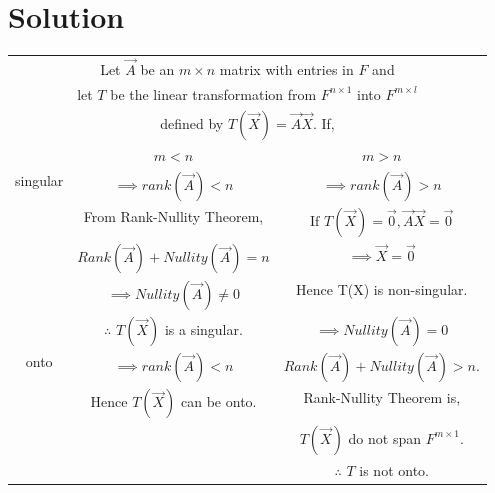 \documentclass[journal,12pt,twocolumn]{IEEEtran}
\begin{document}
\section{Solution}
\begin{table}[hp]
	\begin{center}
	\begin{adjustbox}{width=1\textwidth}
		\begin{tabular}{|c|c|c|}			
			\hline
			\multicolumn{3}{|c|}{Let $\vec{A}$ be an $m \times n$ matrix with entries in $F$ and}\\
			\multicolumn{3}{|c|}{let $T$ be the linear transformation from $F^{n \times1 }$ into $F^{m \times l}$}\\
			\multicolumn{3}{|c|}{defined by $T(\vec{X}) = \vec{A}\vec{X}$. If,}\\			
			\hline
			& \multicolumn{1}{|c|}{$m < n$} & \multicolumn{1}{c|}{$m > n$}\\
			\hline
			\multirow{4}{*}{singular} & \vbox{\begin{equation}\nonumber \implies rank(\vec{A}) < n \end{equation}} & \vbox{\begin{equation}\nonumber\implies rank(\vec{A}) > n\end{equation}}\\
			& From Rank-Nullity Theorem, & $\text{If }T(\vec{X}) = \vec{0}, \vec{A}\vec{X} = \vec{0}$\\
			& \vbox{\begin{equation}\nonumber Rank(\vec{A}) + Nullity(\vec{A}) = n\end{equation}} & $\implies \vec{X} = \vec{0}$\\
			& $\implies Nullity(\vec{A}) \neq 0$ & Hence T(X) is non-singular.\\
			& $\therefore$ $T(\vec{X})$ is a singular. & \vbox{\begin{equation}\nonumber \implies Nullity(\vec{A}) = 0\end{equation}}\\
			\hline
			\multirow{4}{*}{onto} & \vbox{\begin{equation}\nonumber \implies rank(\vec{A}) < n \end{equation}} & \vbox{\begin{equation}\nonumber Rank(\vec{A}) + Nullity(\vec{A}) > n.\end{equation}}\\
			& Hence $T(\vec{X})$ can be onto. & Rank-Nullity Theorem is,\\
			& & $T(\vec{X})$ do not span $F^{m \times 1}.$\\
			& & $\therefore$ $T$ is not onto.\\
			\hline
			\end{tabular}
			\end{adjustbox}
	\end{center}
\end{table}
\end{document}
